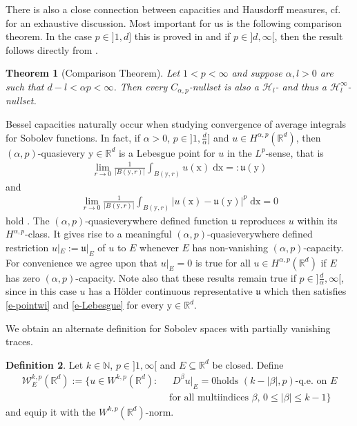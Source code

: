\documentclass[10pt,leqno]{amsart}
\newtheorem{theorem}{Theorem}[section]
\theoremstyle{definition}
\newtheorem{definition}[theorem]{Definition}
\numberwithin{equation}{section}
\begin{document}
There is also a close connection between capacities and Hausdorff measures, cf.\
\cite[Ch.~5.]{ad/he} for an exhaustive discussion. Most important for us is
the following comparison theorem. In the case $p \in {]1, d]}$ this is proved
in \cite[Sec.~5]{ad/he} and if $p \in {]d,\infty[}$, then the result follows
directly from \cite[Prop.~2.6.1]{ad/he}.

\begin{theorem}[Comparison Theorem]\label{t-comparison}
Let $1 < p < \infty$ and suppose $\alpha, l > 0$ are such that $d-l < \alpha p
<\infty$. Then every $C_{\alpha,p}$-nullset is also a ${\mathcal{H}}_l$- and thus a
${\mathcal{H}}_l^\infty$-nullset.
\end{theorem}

Bessel capacities naturally occur when studying convergence of average
integrals for Sobolev functions. In fact, if $\alpha > 0$, $p \in
{]1,\frac{d}{\alpha}]}$ and $u \in H^{\alpha,p}({{\mathbb R}}^d)$, then
$(\alpha,p)$-quasievery ${{\mathrm y}} \in {{\mathbb R}}^d$ is a Lebesgue point for $u$ in the
$L^p$-sense, that is
\begin{align}
\label{e-pointwi}
	  \lim_{r \to 0} \frac {1}{|B({{\mathrm y}},r)|}\int_{B({{\mathrm y}},r)}
		u({{\mathrm x}}) \; {{\mathrm d}} {{\mathrm x}} =: {{\mathfrak u}}({{\mathrm y}})
\end{align}
and
\begin{align}
\label{e-Lebesgue}
	  \lim_{r \to 0} \frac {1}{|B({{\mathrm y}},r)|}\int_{B({{\mathrm y}},r)}
		|u({{\mathrm x}}) - {{\mathfrak u}}({{\mathrm y}})|^p \; {{\mathrm d}} {{\mathrm x}} = 0
\end{align}
hold \cite[Thm.\ 6.2.1]{ad/he}. The $(\alpha,p)$-quasieverywhere defined
function ${{\mathfrak u}}$ reproduces $u$ within its $H^{\alpha,p}$-class. It gives rise to a
meaningful $(\alpha,p)$-quasieverywhere defined restriction $u|_E:= {{\mathfrak u}}|_E$ of
$u$ to $E$ whenever $E$ has non-vanishing $(\alpha,p)$-capacity. For convenience
we agree upon that $u|_E = 0$ is true for all $u \in H^{\alpha,p}({{\mathbb R}}^d)$ if $E$
has zero $(\alpha,p)$-capacity. Note also that these results remain true if $p
\in {]\frac{d}{\alpha},\infty[}$, since in this case $u$ has a H\"older
continuous representative ${{\mathfrak u}}$ which then satisfies \eqref{e-pointwi} and
\eqref{e-Lebesgue} for every ${{\mathrm y}} \in {{\mathbb R}}^d$.

We obtain an alternate definition for Sobolev spaces with partially vanishing
traces.

\begin{definition}
\label{d-Sob cap space}
Let $k \in {{\mathbb N}}$, $p \in {]1, \infty [}$ and $E \subseteq {{\mathbb R}}^d$ be closed. Define
\begin{align*}
 {{{{\mathcal{W}}}}}_E^{k,p}({{\mathbb R}}^d):= \big\{u \in W^{k,p}({{\mathbb R}}^d): &\text{ $D^\beta u|_E = 0$
 holds $(k-|\beta|,p)$-q.e.\ on $E$} \\ &\text{ for all multiindices $\beta$, $0
\leq |\beta| \leq k-1$} \big\}
\end{align*}
and equip it with the $W^{k,p}({{\mathbb R}}^d)$-norm.
\end{definition}
\end{document}
